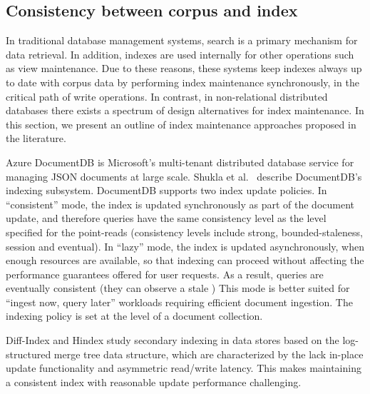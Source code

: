 \subsection{Consistency between corpus and index}
\label{sec:related_index_corpus_consistency}
In traditional database management systems, search is a primary mechanism for data retrieval.
In addition, indexes are used internally for other operations such as view maintenance.
Due to these reasons, these systems keep indexes always up to date with corpus data by performing
index maintenance synchronously, in the critical path of write operations.
In contrast, in non-relational distributed databases there exists a spectrum of design alternatives for index maintenance.
In this section, we present an outline of index maintenance approaches proposed in the literature.

\bigskip
\noindent

Azure DocumentDB is Microsoft's multi-tenant distributed database service for managing JSON documents at large scale.
Shukla et al.\ \cite{shukla:schemaagnostic} describe DocumentDB's indexing subsystem.
DocumentDB supports two index update policies.
In ``consistent'' mode, the index is updated synchronously as part of the document update, and therefore
queries have the same consistency level as the level specified for the point-reads
(consistency levels include strong, bounded-staleness, session and eventual).
In ``lazy'' mode, the index is updated asynchronously, when enough resources are available, so that indexing can proceed
without affecting the performance guarantees offered for user requests.
As a result, queries are eventually consistent (they can observe a stale )
This mode is better suited for ``ingest now, query later'' workloads requiring efficient document ingestion.
The indexing policy is set at the level of a document collection.

\bigskip
\noindent

Diff-Index \cite{tan:diffindex} and Hindex \cite{tang:deferredindexing} study secondary
indexing in data stores based on the log-structured merge tree data structure,
which are characterized by the lack in-place update functionality and asymmetric read/write latency.
This makes maintaining a consistent index with reasonable update performance challenging.

